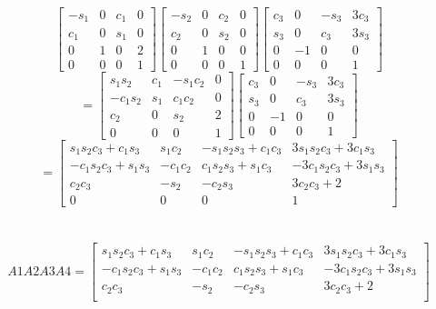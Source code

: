 \documentclass{article}
\begin{document}
{\[\begin{bmatrix}
-s_{1} & 0 & c_{1} & 0 \\
c_{1} & 0 & s_{1} & 0 \\
0 & 1 & 0 & 2 \\
0 & 0 & 0 & 1
\end{bmatrix}
\begin{bmatrix}
-s_{2} & 0 & c_{2} & 0 \\
c_{2} & 0 & s_{2} & 0 \\
0 & 1 & 0 & 0 \\
0 & 0 & 0 & 1
\end{bmatrix}
\begin{bmatrix}
c_{3} & 0 & -s_{3} & 3c_{3} \\
s_{3} & 0 & c_{3} & 3s_{3} \\
0 & -1 & 0 & 0 \\
0 & 0 & 0 & 1
\end{bmatrix}
\]
\[
=
\begin{bmatrix}
s_{1}s_{2} & c_{1} & -s_{1}c_{2} & 0 \\
-c_{1}s_{2} & s_{1} & c_{1}c_{2} & 0 \\
c_{2} & 0 & s_{2} & 2 \\
0 & 0 & 0 & 1
\end{bmatrix}
\begin{bmatrix}
c_{3} & 0 & -s_{3} & 3c_{3} \\
s_{3} & 0 & c_{3} & 3s_{3} \\
0 & -1 & 0 & 0 \\
0 & 0 & 0 & 1
\end{bmatrix}
\]
\[
=
\begin{bmatrix}
s_{1}s_{2}c_{3} + c_{1}s_{3} & s_{1}c_{2} & -s_{1}s_{2}s_{3} + c_{1}c_{3} & 3s_{1}s_{2}c_{3} + 3c_{1}s_{3} \\
-c_{1}s_{2}c_{3} + s_{1}s_{3} & -c_{1}c_{2} & c_{1}s_{2}s_{3} + s_{1}c_{3} & -3c_{1}s_{2}c_{3} + 3s_{1}s_{3} \\
c_{2}c_{3} & -s_{2} & -c_{2}s_{3} & 3c_{2}c_{3}+2 \\
0 & 0 & 0 & 1
\end{bmatrix}
\]
\\
\\
\[
A1A2A3A4=
\begin{bmatrix}
s_{1}s_{2}c_{3} + c_{1}s_{3} & s_{1}c_{2} & -s_{1}s_{2}s_{3} + c_{1}c_{3} & 3s_{1}s_{2}c_{3} + 3c_{1}s_{3} \\
-c_{1}s_{2}c_{3} + s_{1}s_{3} & -c_{1}c_{2} & c_{1}s_{2}s_{3} + s_{1}c_{3} & -3c_{1}s_{2}c_{3} + 3s_{1}s_{3} \\
c_{2}c_{3} & -s_{2} & -c_{2}s_{3} & 3c_{2}c_{3}+2 \\

\end{bmatrix}\]}
\end{document}
